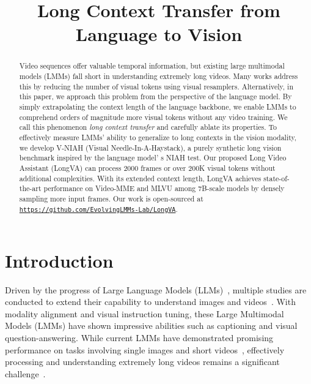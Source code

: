 \title{Long Context Transfer from Language to Vision}



\maketitle
\renewcommand{\thefootnote}{\fnsymbol{footnote}}
\renewcommand*{\thefootnote}{\arabic{footnote}}

\begin{abstract}

Video sequences offer valuable temporal information, but existing large multimodal models (LMMs) fall short in understanding extremely long videos. Many works address this by reducing the number of visual tokens using visual resamplers. Alternatively, in this paper, we approach this problem from the perspective of the language model. By simply extrapolating the context length of the language backbone, we enable LMMs to comprehend orders of magnitude more visual tokens without any video training. We call this phenomenon \textit{long context transfer} and carefully ablate its properties. To effectively measure LMMs' ability to generalize to long contexts in the vision modality, we develop V-NIAH (Visual Needle-In-A-Haystack), a purely synthetic long vision benchmark inspired by the language model'
s NIAH test. Our proposed Long Video Assistant (LongVA) can process 2000 frames or over 200K visual tokens without additional complexities. With its extended context length, LongVA achieves state-of-the-art performance on Video-MME and MLVU among 7B-scale models by densely sampling more input frames. Our work is open-sourced at \href{https://github.com/EvolvingLMMs-Lab/LongVA}{\texttt{https://github.com/EvolvingLMMs-Lab/LongVA}}.

\end{abstract}\section{Introduction}

Driven by the progress of Large Language Models (LLMs)~\citep{gpt3, anil2023palm, touvron2023llama, geminiteam2024gemini, ormazabal2024reka,mixtral2024,commandrplus2024}, multiple studies are conducted to extend their capability to understand images and videos~\citep{li2023blip2, dai2023instructblip, qwenvl2024, liu2023llava}. With modality alignment and visual instruction tuning, these Large Multimodal Models (LMMs) have shown impressive abilities such as captioning and visual question-answering. While current LMMs have demonstrated promising performance on tasks involving single images and short videos~\citep{song2024moviechat, lin2023videollava, maaz2023videochatgpt, zhang2023videollama}, effectively processing and understanding extremely long videos remains a significant challenge~\citep{wang2024lvbench}.

